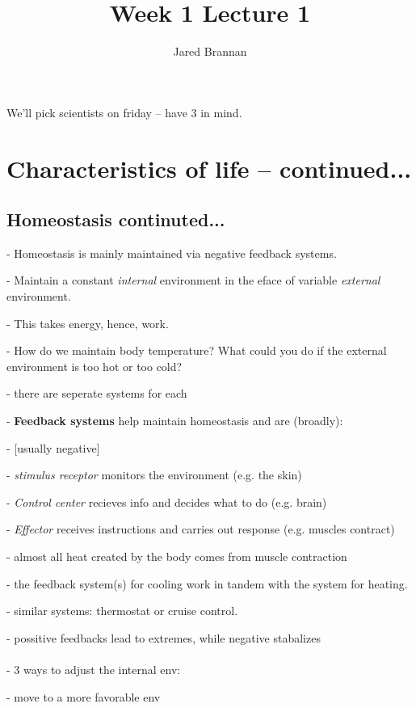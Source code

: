 \documentclass{article}
\title{Week 1 Lecture 1}
\author{Jared Brannan }
\theoremstyle{definition}
\begin{document}
\maketitle

We'll pick scientists on friday -- have 3 in mind.

\section{Characteristics of life -- continued...}

\subsection{Homeostasis continuted...}

- Homeostasis is mainly maintained via negative feedback systems.

- Maintain a constant \textit{internal} environment in the eface of variable \textit{external} environment.

- This takes energy, hence, work.

- How do we maintain body temperature? What could you do if the external environment is too hot or too cold?

\indent\indent - there are seperate systems for each

- \textbf{Feedback systems} help maintain homeostasis and are (broadly):

\indent\indent- [usually negative]

\indent\indent - \textit{stimulus receptor} monitors the environment (e.g. the skin)

\indent\indent - \textit{Control center}  recieves info and decides what to do (e.g. brain)

\indent\indent - \textit{Effector}  receives instructions and carries out response (e.g. muscles contract)

- almost all heat created by the body comes from muscle contraction

- the feedback system(s) for cooling work in tandem with the system for heating.

- similar systems: thermostat or cruise control.

- possitive feedbacks lead to extremes, while negative stabalizes\\~\\

- 3 ways to adjust the internal env:

\indent\indent - move to a more favorable env
\end{document}
